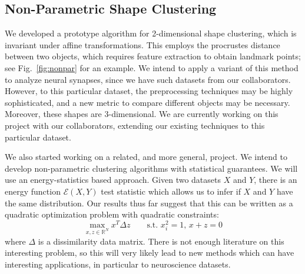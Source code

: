 \documentclass[simplex.tex]{subfiles}
\begin{document}
\subsection{Non-Parametric Shape Clustering}
We developed a prototype algorithm for 2-dimensional shape clustering, which
is invariant under affine transformations. This employs the procrustes
distance between two objects, which requires feature extraction to obtain
landmark points; see Fig.~\ref{fig:nonpar} for an example. 
We intend to apply a variant of this method to analyze neural synapses,
since we have such datasets from our collaborators. However, to this particular
dataset, the preprocessing techniques may be highly sophisticated, and a new
metric to compare different objects may be necessary. Moreover, these shapes are
3-dimensional. We are currently working on this project
with our collaborators, extending our existing  techniques to this 
particular dataset.

We also started working on a related, and more general, project.
We intend to develop non-parametric clustering algorithms with statistical
guarantees. We will use an energy-statistics based approach. Given
two datasets $X$ and $Y$, there is an energy function $\mathcal{E}(X,Y)$
test statistic which allows us to infer if $X$ and $Y$ have the same
distribution. Our results thus far suggest that this can be written
as a quadratic optimization problem
with quadratic constraints: 
\begin{equation}
\max_{x,z\in \mathbb{R}^N} x^T \Delta z \qquad \mbox{s.t. $x_i^2=1$, $x+z = 0$}
\end{equation}
where $\Delta$ is a dissimilarity data matrix.
There is not enough literature on
this interesting problem, so this will very likely lead to new methods which
can have interesting applications, in particular to neuroscience datasets.
\end{document}
